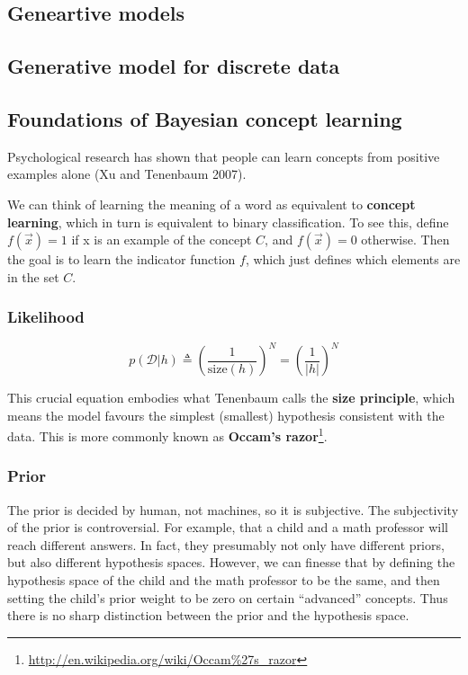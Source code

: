 \begin{refsection}
	\startcontents[chapters]	
	\chapter{Geneartive models}\label{ch:statistical-learning}

\section{Generative model for discrete data}

\section{Foundations of Bayesian concept learning}
Psychological research has shown that people can learn concepts from positive examples alone (Xu and Tenenbaum 2007).

We can think of learning the meaning of a word as equivalent to \textbf{concept learning}, which in turn is equivalent to binary classification. To see this, define $f(\vec{x})=1$ if x is an example of the concept $C$, and $f(\vec{x})=0$ otherwise. Then the goal is to learn the indicator function $f$, which just defines which elements are in the set $C$.


\subsection{Likelihood}
\begin{equation}
p(\mathcal{D}|h) \triangleq \left(\dfrac{1}{\text{size}(h)}\right)^N=\left(\dfrac{1}{|h|}\right)^N
\end{equation}

This crucial equation embodies what Tenenbaum calls the \textbf{size principle}, which means the model favours the simplest (smallest) hypothesis consistent with the data. This is more commonly known as \textbf{Occam’s razor}\footnote{\url{http://en.wikipedia.org/wiki/Occam\%27s_razor}}.


\subsection{Prior}
The prior is decided by human, not machines, so it is subjective. The subjectivity of the prior is controversial. For example, that a child and a math professor will reach different answers. In fact, they presumably not only have different priors, but also different hypothesis spaces. However, we can finesse that by defining the hypothesis space of the child and the math professor to be the same, and then setting the child’s prior weight to be zero on certain “advanced” concepts. Thus there is no sharp distinction between the prior and the hypothesis space.


\end{refsection}
